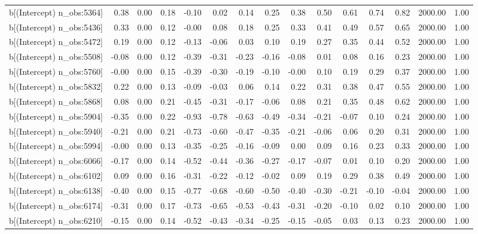 \begin{table}[ht]
\begin{tabular}{rrrrrrrrrrrrrrr}
  b[(Intercept) n\_obs:5364] & 0.38 & 0.00 & 0.18 & -0.10 & 0.02 & 0.14 & 0.25 & 0.38 & 0.50 & 0.61 & 0.74 & 0.82 & 2000.00 & 1.00 \\ 
  b[(Intercept) n\_obs:5436] & 0.33 & 0.00 & 0.12 & -0.00 & 0.08 & 0.18 & 0.25 & 0.33 & 0.41 & 0.49 & 0.57 & 0.65 & 2000.00 & 1.00 \\ 
  b[(Intercept) n\_obs:5472] & 0.19 & 0.00 & 0.12 & -0.13 & -0.06 & 0.03 & 0.10 & 0.19 & 0.27 & 0.35 & 0.44 & 0.52 & 2000.00 & 1.00 \\ 
  b[(Intercept) n\_obs:5508] & -0.08 & 0.00 & 0.12 & -0.39 & -0.31 & -0.23 & -0.16 & -0.08 & 0.01 & 0.08 & 0.16 & 0.23 & 2000.00 & 1.00 \\ 
  b[(Intercept) n\_obs:5760] & -0.00 & 0.00 & 0.15 & -0.39 & -0.30 & -0.19 & -0.10 & -0.00 & 0.10 & 0.19 & 0.29 & 0.37 & 2000.00 & 1.00 \\ 
  b[(Intercept) n\_obs:5832] & 0.22 & 0.00 & 0.13 & -0.09 & -0.03 & 0.06 & 0.14 & 0.22 & 0.31 & 0.38 & 0.47 & 0.55 & 2000.00 & 1.00 \\ 
  b[(Intercept) n\_obs:5868] & 0.08 & 0.00 & 0.21 & -0.45 & -0.31 & -0.17 & -0.06 & 0.08 & 0.21 & 0.35 & 0.48 & 0.62 & 2000.00 & 1.00 \\ 
  b[(Intercept) n\_obs:5904] & -0.35 & 0.00 & 0.22 & -0.93 & -0.78 & -0.63 & -0.49 & -0.34 & -0.21 & -0.07 & 0.10 & 0.24 & 2000.00 & 1.00 \\ 
  b[(Intercept) n\_obs:5940] & -0.21 & 0.00 & 0.21 & -0.73 & -0.60 & -0.47 & -0.35 & -0.21 & -0.06 & 0.06 & 0.20 & 0.31 & 2000.00 & 1.00 \\ 
  b[(Intercept) n\_obs:5994] & -0.00 & 0.00 & 0.13 & -0.35 & -0.25 & -0.16 & -0.09 & 0.00 & 0.09 & 0.16 & 0.23 & 0.33 & 2000.00 & 1.00 \\ 
  b[(Intercept) n\_obs:6066] & -0.17 & 0.00 & 0.14 & -0.52 & -0.44 & -0.36 & -0.27 & -0.17 & -0.07 & 0.01 & 0.10 & 0.20 & 2000.00 & 1.00 \\ 
  b[(Intercept) n\_obs:6102] & 0.09 & 0.00 & 0.16 & -0.31 & -0.22 & -0.12 & -0.02 & 0.09 & 0.19 & 0.29 & 0.38 & 0.49 & 2000.00 & 1.00 \\ 
  b[(Intercept) n\_obs:6138] & -0.40 & 0.00 & 0.15 & -0.77 & -0.68 & -0.60 & -0.50 & -0.40 & -0.30 & -0.21 & -0.10 & -0.04 & 2000.00 & 1.00 \\ 
  b[(Intercept) n\_obs:6174] & -0.31 & 0.00 & 0.17 & -0.73 & -0.65 & -0.53 & -0.43 & -0.31 & -0.20 & -0.10 & 0.02 & 0.10 & 2000.00 & 1.00 \\ 
  b[(Intercept) n\_obs:6210] & -0.15 & 0.00 & 0.14 & -0.52 & -0.43 & -0.34 & -0.25 & -0.15 & -0.05 & 0.03 & 0.13 & 0.23 & 2000.00 & 1.00 \\ 

\end{tabular}
\end{table}
